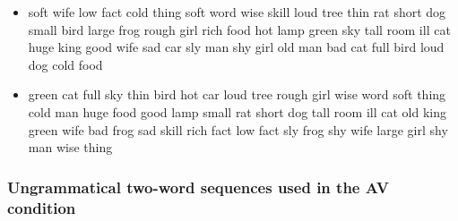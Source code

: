 \documentclass[10pt,letterpaper]{article}
\begin{document}
\begin{itemize}
  \item soft wife low fact cold thing soft word wise skill loud tree
    thin rat short dog small bird large frog rough girl rich food hot
    lamp green sky tall room ill cat huge king good wife sad car sly
    man shy girl old man bad cat full bird loud dog cold food

  \item green cat full sky thin bird hot car loud tree rough girl wise
    word soft thing cold man huge food good lamp small rat short dog
    tall room ill cat old king green wife bad frog sad skill rich fact
    low fact sly frog shy wife large girl shy man wise thing

\end{itemize}

\subsubsection*{Ungrammatical two-word sequences used in the AV condition}
\end{document}
